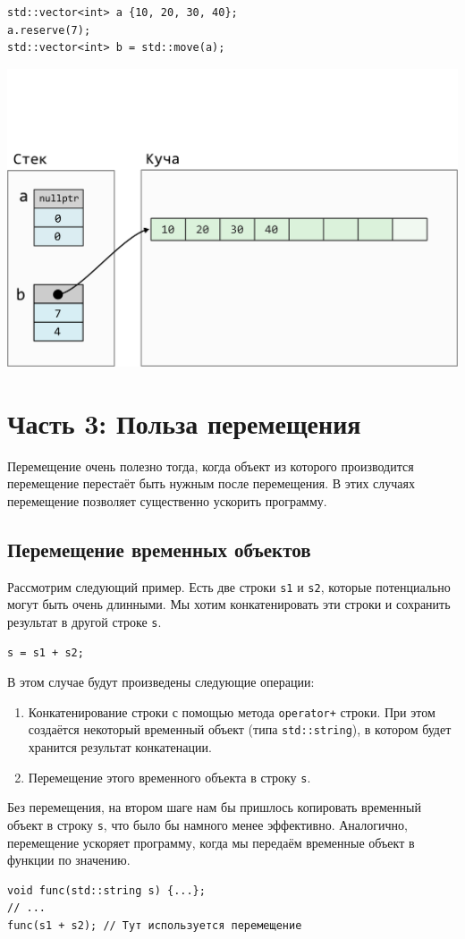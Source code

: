 \documentclass{article}
\begin{document}
\begin{lstlisting}
std::vector<int> a {10, 20, 30, 40};
a.reserve(7);
std::vector<int> b = std::move(a);
\end{lstlisting}
\begin{center}
\vspace*{-2.5cm}
\includegraphics[scale=0.7]{../images/vector_move.png}
\end{center}


\newpage

\section*{Часть 3: Польза перемещения}
Перемещение очень полезно тогда, когда объект из которого производится перемещение перестаёт быть нужным после перемещения. В этих случаях перемещение позволяет существенно ускорить программу.
\subsection*{Перемещение временных объектов}
Рассмотрим следующий пример. Есть две строки \texttt{s1} и \texttt{s2}, которые потенциально могут быть очень длинными. Мы хотим конкатенировать эти строки и сохранить результат в другой строке \texttt{s}.
\begin{lstlisting}
s = s1 + s2;
\end{lstlisting}
В этом случае будут произведены следующие операции:
\begin{enumerate}
\item Конкатенирование строки с помощью метода \texttt{operator+} строки. При этом создаётся некоторый временный объект (типа \texttt{std::string}), в котором будет хранится результат конкатенации.
\item Перемещение этого временного объекта в строку \texttt{s}.
\end{enumerate}
Без перемещения, на втором шаге нам бы пришлось копировать временный объект в строку \texttt{s}, что было бы намного менее эффективно.
Аналогично, перемещение ускоряет программу, когда мы передаём временные объект в функции по значению.
\begin{lstlisting}
void func(std::string s) {...};
// ...
func(s1 + s2); // Тут используется перемещение
\end{lstlisting}
\end{document}
